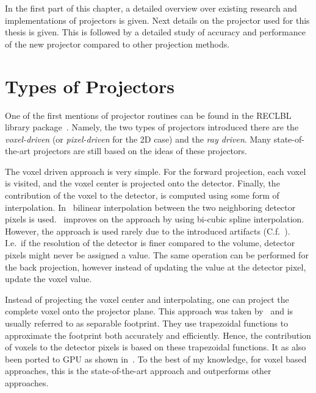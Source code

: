 In the first part of this chapter, a detailed overview over existing research and implementations of
projectors is given. Next details on the projector used for this thesis is given. This is followed
by a detailed study of accuracy and performance of the new projector compared to other projection
methods.

\section{Types of Projectors}\label{sec:projector_types}

One of the first mentions of projector routines can be found in the RECLBL library
package~\cite{huesman_reclbl_1977}. Namely, the two types of projectors introduced there are the
\textit{voxel-driven} (or \textit{pixel-driven} for the 2D case) and the \textit{ray driven}. Many
state-of-the-art projectors are still based on the ideas of these projectors.

The voxel driven approach is very simple. For the forward projection, each voxel is visited, and the
voxel center is projected onto the detector. Finally, the contribution of the voxel to the detector,
is computed using some form of interpolation. In~\cite{peters_algorithms_1981} bilinear
interpolation between the two neighboring detector pixels is used.~\cite{harauz_interpolation_1983}
improves on the approach by using bi-cubic spline interpolation. However, the approach is used
rarely due to the introduced artifacts (C.f.~\cite[Chapter~3.3]{levakhina_three-dimensional_2014}).
I.e.\ if the resolution of the detector is finer compared to the volume, detector pixels might never
be assigned a value. The same operation can be performed for the back projection, however instead of
updating the value at the detector pixel, update the voxel value.

Instead of projecting the voxel center and interpolating, one can project the complete voxel onto
the projector plane. This approach was taken by~\cite{long_3d_2010, long_3d_2010-1} and is usually
referred to as separable footprint. They use trapezoidal functions to approximate the footprint both
accurately and efficiently. Hence, the contribution of voxels to the detector pixels is based on
these trapezoidal functions. It as also been ported to \gls{GPU} as shown in~\cite{wu_gpu_2011,
	xie_effective_2015, chapdelaine_new_2018}. To the best of my knowledge, for voxel based
approaches, this is the state-of-the-art approach and outperforms other approaches.

